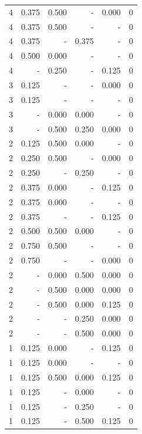 \documentclass[a4paper]{article}\usepackage[]{graphicx}\usepackage[]{color}
\begin{document}
\begin{table}[ht]
\begin{tabular}{rrrrrr}
  4 & 0.375 & 0.500 & - & 0.000 & 0 \\ 
  4 & 0.375 & 0.500 & - & - & 0 \\ 
   \rowcolor{sosoColor} 4 & 0.375 & - & 0.375 & - & 0 \\ 
  4 & 0.500 & 0.000 & - & - & 0 \\ 
  4 & - & 0.250 & - & 0.125 & 0 \\ 
   \rowcolor{nullColor} 3 & 0.125 & - & - & 0.000 & 0 \\ 
   \rowcolor{nullColor} 3 & 0.125 & - & - & - & 0 \\ 
   \rowcolor{goodColor} 3 & - & 0.000 & 0.000 & - & 0 \\ 
   \rowcolor{badColor} 3 & - & 0.500 & 0.250 & 0.000 & 0 \\ 
   \rowcolor{badColor} 2 & 0.125 & 0.500 & 0.000 & - & 0 \\ 
  2 & 0.250 & 0.500 & - & 0.000 & 0 \\ 
   \rowcolor{sosoColor} 2 & 0.250 & - & 0.250 & - & 0 \\ 
  2 & 0.375 & 0.000 & - & 0.125 & 0 \\ 
  2 & 0.375 & 0.000 & - & - & 0 \\ 
   \rowcolor{nullColor} 2 & 0.375 & - & - & 0.125 & 0 \\ 
   \rowcolor{badColor} 2 & 0.500 & 0.500 & 0.000 & - & 0 \\ 
  2 & 0.750 & 0.500 & - & - & 0 \\ 
   \rowcolor{nullColor} 2 & 0.750 & - & - & 0.000 & 0 \\ 
   \rowcolor{badColor} 2 & - & 0.000 & 0.500 & 0.000 & 0 \\ 
   \rowcolor{badColor} 2 & - & 0.500 & 0.000 & 0.000 & 0 \\ 
   \rowcolor{badColor} 2 & - & 0.500 & 0.000 & 0.125 & 0 \\ 
   \rowcolor{sosoColor} 2 & - & - & 0.250 & 0.000 & 0 \\ 
   \rowcolor{sosoColor} 2 & - & - & 0.500 & 0.000 & 0 \\ 
  1 & 0.125 & 0.000 & - & 0.125 & 0 \\ 
  1 & 0.125 & 0.000 & - & - & 0 \\ 
   \rowcolor{badColor} 1 & 0.125 & 0.500 & 0.000 & 0.125 & 0 \\ 
   \rowcolor{sosoColor} 1 & 0.125 & - & 0.000 & - & 0 \\ 
   \rowcolor{sosoColor} 1 & 0.125 & - & 0.250 & - & 0 \\ 
   \rowcolor{sosoColor} 1 & 0.125 & - & 0.500 & 0.125 & 0 \\ 

\end{tabular}
\end{table}
\end{document}
